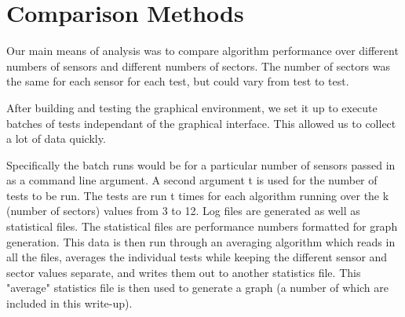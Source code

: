 \section{Comparison Methods}

Our main means of analysis was to compare algorithm performance over different numbers of sensors and different numbers of sectors. The number of sectors was the same for each sensor for each test, but could vary from test to test.

After building and testing the graphical environment, we set it up to execute batches of tests independant of the graphical interface. This allowed us to collect a lot of data quickly.

Specifically the batch runs would be for a particular number of sensors passed in as a command line argument. A second argument t is used for the number of tests to be run. The tests are run t times for each algorithm running over the k (number of sectors) values from 3 to 12. Log files are generated as well as statistical files. The statistical files are performance numbers formatted for graph generation. 
This data is then run through an averaging algorithm which reads in all the files, averages the individual tests while keeping the different sensor and sector values separate, and writes them out to another statistics file. This "average" statistics file is then used to generate a graph (a number of which are included in this write-up).
